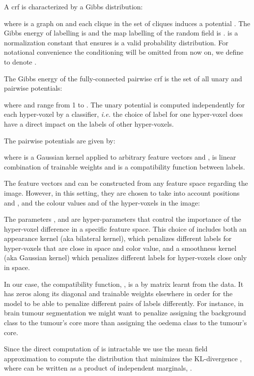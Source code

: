 \documentclass{article}
\begin{document}
A \acrlong{crf}  is characterized by a Gibbs distribution:

where  is a graph on  and each clique  in the set of cliques  induces a potential . 
The Gibbs energy of labelling  is  and the \gls{map} labelling of the random field is .
 is a normalization constant that ensures  is a valid probability distribution.
For notational convenience the conditioning will be omitted from now on, we define  to denote .


The Gibbs energy of the fully-connected pairwise \gls{crf} is the set of all unary and pairwise potentials:

where  and  range from 1 to .
The unary potential  is computed independently for each hyper-voxel by a classifier, \textit{i.e.} the choice of label for one hyper-voxel does have a direct impact on the labels of other hyper-voxels.

The pairwise potentials are given by:
 

where  is a Gaussian kernel applied to arbitrary feature vectors  and ,  is linear combination of trainable weights and  is a compatibility function between labels.

The feature vectors  and  can be constructed from any feature space regarding the image. 
However, in this setting, they are chosen to take into account positions  and , and the colour values  and  of the hyper-voxels in the image:



The parameters ,  and  are hyper-parameters that control the importance of the hyper-voxel difference in a specific feature space.
This choice of  includes both an appearance kernel (aka bilateral kernel), which penalizes different labels for hyper-voxels that are close in space and color value, and a smoothness kernel (aka Gaussian kernel) which penalizes different labels for hyper-voxels close only in space.

In our case, the compatibility function, , is a  by  matrix learnt from the data.
It has zeros along its diagonal and trainable weights elsewhere in order for the model to be able to penalize different pairs of labels differently.
For instance, in brain tumour segmentation we might want to penalize assigning the background class to the tumour's core more than assigning the oedema class to the tumour's core.

Since the direct computation of  is intractable we use the mean field approximation to compute the distribution  that minimizes the KL-divergence , where  can be written as a product of independent marginals, .
\end{document}
